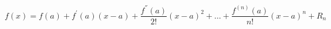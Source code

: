 \documentclass{article}
\begin{document}
	\begin{equation*}
		f(x) = f(a) + f^{'}(a)(x - a) + \frac{f^{''}(a)}{2!}(x - a)^{2}+ \hdots + \frac{f^{(n)}(a)}{n!}
		(x - a)^{n}+ R_{n}
	\end{equation*}
\end{document}
